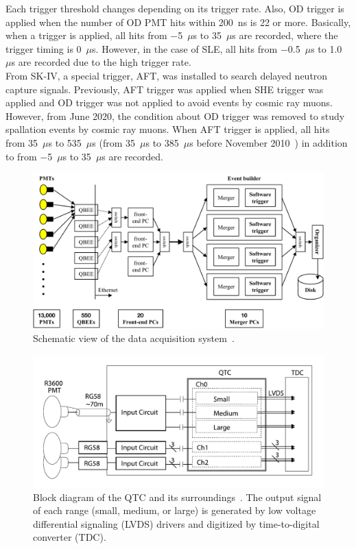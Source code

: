 Each trigger threshold changes depending on its trigger rate.
Also, OD trigger is applied when the number of OD PMT hits within 200~ns is 22 or more.
Basically, when a trigger is applied, all hits from $-$5~$\mu$s to 35~$\mu$s are recorded, where the trigger timing is 0~$\mu$s.
However, in the case of SLE, all hits from $-$0.5~$\mu$s to 1.0~$\mu$s are recorded due to the high trigger rate.\\
\hs
From SK-IV, a special trigger, AFT, was installed to search delayed neutron capture signals.
Previously, AFT trigger was applied when SHE trigger was applied and OD trigger was not applied to avoid events by cosmic ray muons.
However, from June 2020, the condition about OD trigger was removed to study spallation events by cosmic ray muons.
When AFT trigger is applied, all hits from 35~$\mu$s to 535~$\mu$s (from 35~$\mu$s to 385~$\mu$s before November 2010~\cite{2021Abe}) in addition to from $-$5~$\mu$s to 35~$\mu$s are recorded.

\begin{figure}[h]
	\centering
	\includegraphics[width=12cm]{Figures/SK/DAQ}
	\caption[Schematic view of the data acquisition system]{
	Schematic view of the data acquisition system~\cite{2010Yamada}.
	}\label{SK_DAQ}
\end{figure}

\begin{figure}[h]
	\centering
	\includegraphics[width=12cm]{Figures/SK/QTC}
	\caption[Block diagram of the QTC and its surroundings]{
	Block diagram of the QTC and its surroundings~\cite{2009Nishino}.
	The output signal of each range (small, medium, or large) is generated by low voltage differential signaling (LVDS) drivers and digitized by time-to-digital converter (TDC).
	}\label{SK_QTC}
\end{figure}

